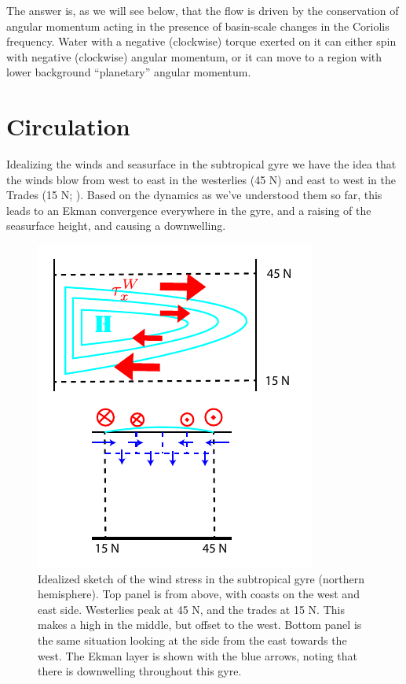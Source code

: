 The answer is, as we will see below, that the flow is driven by the conservation of angular momentum acting in the presence of basin-scale changes in the Coriolis frequency.  Water with a negative (clockwise) torque exerted on it can either spin with negative (clockwise) angular momentum, or it can move to a region with lower background ``planetary'' angular momentum. 

\section{Circulation}

Idealizing the winds and seasurface in the subtropical gyre we have the idea that the winds blow from west to east in the westerlies (45 N) and east to west in the Trades (15 N; ).  Based on the dynamics as we've understood them so far, this leads to an Ekman convergence everywhere in the gyre, and a raising of the seasurface height, and causing a downwelling.  

\begin{figure}[hbt]
  \begin{center}
    \includegraphics{figs/Sverdrup/GyreSketch}
    \caption{Idealized sketch of the wind stress in the subtropical gyre (northern hemisphere).   Top panel is from above, with coasts on the west and east side.  Westerlies peak at 45 N, and the trades at 15 N.  This makes a high in the middle, but offset to the west.  Bottom panel is the same situation looking at the side from the east towards the west. The Ekman layer is shown with the blue arrows, noting that there is downwelling throughout this gyre.}
    \label{fig:GyreSketch}  
  \end{center}
\end{figure}

